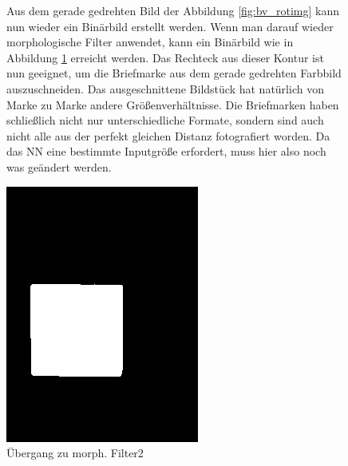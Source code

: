 \documentclass[12pt,toc=bib,toc=listof]{scrreprt}
\begin{document}
\begin{figure}[h]
\begin{minipage}[t]{.75\linewidth}

Aus dem gerade gedrehten Bild der Abbildung \ref{fig:bv_rotimg} kann nun wieder ein Binärbild erstellt werden. Wenn man darauf wieder morphologische Filter anwendet, kann ein Binärbild wie in Abbildung \ref{fig:bv_morph2} erreicht werden. Das Rechteck aus dieser Kontur ist nun geeignet, um die Briefmarke aus dem gerade gedrehten Farbbild auszuschneiden. Das ausgeschnittene Bildstück hat natürlich von Marke zu Marke andere Größenverhältnisse. Die Briefmarken haben schließlich nicht nur unterschiedliche Formate, sondern sind auch nicht alle aus der perfekt gleichen Distanz fotografiert worden. Da das NN eine bestimmte Inputgröße erfordert, muss hier also noch was geändert werden.
\end{minipage}
\hfill
\begin{minipage}[t]{.2\linewidth}
\strut\vspace*{-\baselineskip}
\newline
  \includegraphics[width=\linewidth]{./../bilder/bin2morph}
  \caption{Übergang zu morph. Filter2}
  \label{fig:bv_morph2}
\end{minipage}
\end{figure}
\end{document}
